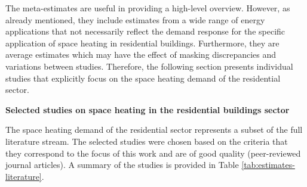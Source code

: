 \documentclass[12pt,twoside]{reedthesis}
\begin{document}
The meta-estimates are useful in providing a high-level overview. However, as already mentioned, they include estimates from a wide range of energy applications that not necessarily reflect the demand response for the specific application of space heating in residential buildings. Furthermore, they are average estimates which may have the effect of masking discrepancies and variations between studies. Therefore, the following section presents individual studies that explicitly focus on the space heating demand of the residential sector.

\textbf{Selected studies on space heating in the residential buildings sector}

The space heating demand of the residential sector represents a subset of the full literature stream. The selected studies were chosen based on the criteria that they correspond to the focus of this work and are of good quality (peer-reviewed journal articles). A summary of the studies is provided in Table \ref{tab:estimates-literature}.
\end{document}
